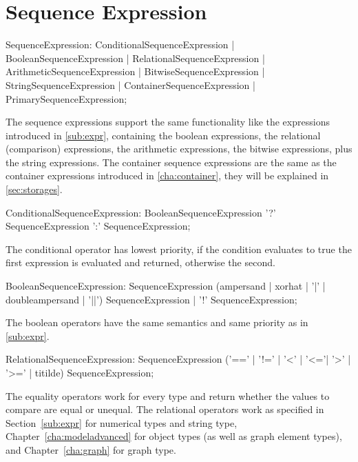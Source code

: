 \section{Sequence Expression} \label{sec:seqexpr}

\begin{rail}
  SequenceExpression:  
    ConditionalSequenceExpression |
    BooleanSequenceExpression |
    RelationalSequenceExpression |
    ArithmeticSequenceExpression |
    BitwiseSequenceExpression |
    StringSequenceExpression |
    ContainerSequenceExpression |
    PrimarySequenceExpression;
\end{rail}

The sequence expressions support the same functionality like the expressions introduced in \ref{sub:expr}, containing 
the boolean expressions,
the relational (comparison) expressions,
the arithmetic expressions,
the bitwise expressions,
plus the string expressions.
The container sequence expressions are the same as the container expressions introduced in \ref{cha:container}, they will be explained in \ref{sec:storages}.

\begin{rail}
  ConditionalSequenceExpression: 
    BooleanSequenceExpression '?' SequenceExpression ':' SequenceExpression;
\end{rail}

The conditional operator has lowest priority, if the condition evaluates to true the first expression is evaluated and returned, otherwise the second.

\begin{rail}
  BooleanSequenceExpression: 
    SequenceExpression (ampersand | xorhat | '|' | doubleampersand | '||') SequenceExpression |
    '!' SequenceExpression;
\end{rail}

The boolean operators have the same semantics and same priority as in \ref{sub:expr}.

\begin{rail}
  RelationalSequenceExpression: 
    SequenceExpression ('==' | '!=' | '<' | '<='| '>' | '>=' | titilde) SequenceExpression;
\end{rail}

The equality operators work for every type and return whether the values to compare are equal or unequal.
The relational operators work as specified in Section~\ref{sub:expr} for numerical types and string type, 
Chapter~\ref{cha:modeladvanced} for object types (as well as graph element types), and Chapter~\ref{cha:graph} for graph type.

